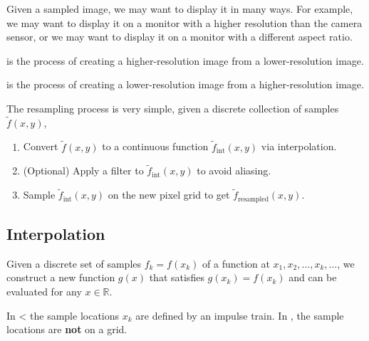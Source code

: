Given a sampled image, we may want to display it in many ways. For example, we may want to display it on a monitor with a higher resolution than the camera sensor, or we may want to display it on a monitor with a different aspect ratio.

\begin{definition}\label{def:super-sampling}
     is the process of creating a higher-resolution image from a lower-resolution image. 
\end{definition}

\begin{definition}\label{def:sub-sampling}
     is the process of creating a lower-resolution image from a higher-resolution image.
\end{definition}

The resampling process is very simple, given a discrete collection of samples $\tilde{f}(x, y)$, 
\begin{enumerate}
    \item Convert $\tilde{f}(x, y)$ to a continuous function $\tilde{f}_{\text{int}}(x, y)$ via interpolation.
    \item (Optional) Apply a filter to $\tilde{f}_{\text{int}}(x, y)$ to avoid aliasing.
    \item Sample $\tilde{f}_{\text{int}}(x, y)$ on the new pixel grid to get $\tilde{f}_{\text{resampled}}(x, y)$.
\end{enumerate}

\subsection{Interpolation}

\begin{definition}\label{def:function-interpolation}
    Given a discrete set of samples $f_k = f(x_k)$ of a function at $x_1, x_2, \dots, x_k, \dots$, we construct a new function $g(x)$ that satisfies $g(x_k) = f(x_k)$ and can be evaluated for any $x \in \mathbb{R}$. 
\end{definition}

In < the sample locations $x_k$ are defined by an impulse train. In , the sample locations are \textbf{not} on a grid. 

